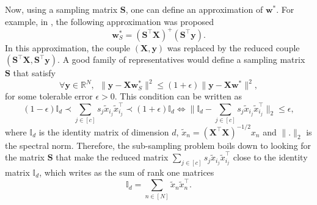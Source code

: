\documentclass[twoside,11pt]{book}
\numberwithin{theorem}{chapter}
\numberwithin{definition}{chapter}
\numberwithin{proposition}{chapter}
\numberwithin{corollary}{chapter}
\numberwithin{example}{chapter}
\numberwithin{lemma}{chapter}
\numberwithin{assumption}{chapter}
\numberwithin{equation}{chapter}
\numberwithin{figure}{chapter}
\DeclareMathOperator{\Tran}{\intercal}
\begin{document}
 Now, using a sampling matrix $\bm{S}$, one can define an approximation of $\bm{w}^{*}$. For example, in \citep*{DrMaMu06}, the following approximation was proposed
\begin{equation}
\bm{w}_{S}^{*} = (\bm{S}^{\Tran}\bm{X})^{+} (\bm{S}^{\Tran}\bm{y}).
\end{equation}
In this approximation, the couple $(\bm{X},\bm{y})$ was replaced by the reduced couple $(\bm{S}^{\Tran}\bm{X},\bm{S}^{\Tran}\bm{y})$.
A good family of representatives would define a sampling matrix $\bm{S}$ that satisfy
\begin{equation}
\forall \bm{y} \in \mathbb{R}^{N}, \:\: \|\bm{y} - \bm{X} \bm{w}_{S}^{*}\|^{2} \leq (1+\epsilon) \|\bm{y} - \bm{X} \bm{w}^{*}\|^{2},
\end{equation}
for some tolerable error $\epsilon >0$. This condition can be written as
\begin{equation}\label{eq:introduction_embedding_condition}
(1-\epsilon) \mathbb{I}_{d} \prec \sum\limits_{j \in [c]} s_{j} \tilde{x}_{i_{j}} \tilde{x}_{i_{j}}^{\Tran} \prec (1+\epsilon) \mathbb{I}_{d} \iff \|\mathbb{I}_{d} - \sum\limits_{j \in [c]} s_{j} \tilde{x}_{i_{j}} \tilde{x}_{i_{j}}^{\Tran}\|_{2} \leq \epsilon,
\end{equation}
where $\mathbb{I}_{d}$ is the identity matrix of dimension $d$, $\tilde{x}_{n} = (\bm{X}^{\Tran}\bm{X})^{-1/2} x_{n}$ and $\|.\|_{2}$ is the spectral norm.
Therefore, the sub-sampling problem boils down to looking for the matrix $\bm{S}$ that make the reduced matrix $\sum_{j \in [c]} s_{j} \tilde{x}_{i_{j}} \tilde{x}_{i_{j}}^{\Tran}$ close to the identity matrix $\mathbb{I}_{d}$, which writes as the sum of rank one matrices
\begin{equation}\label{eq:sum_to_identity_real}
\mathbb{I}_{d} = \sum\limits_{n \in [N]}\tilde{x}_{n}\tilde{x}_{n}^{\Tran}.
\end{equation}
\end{document}
